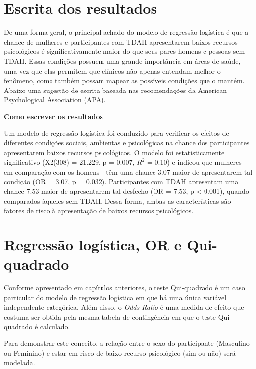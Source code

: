 \documentclass[
]{book}
\begin{document}
\hypertarget{escrita-dos-resultados-14}{%
\section{Escrita dos resultados}\label{escrita-dos-resultados-14}}

De uma forma geral, o principal achado do modelo de regressão logística é que a chance de mulheres e participantes com TDAH apresentarem baixos recursos psicológicos é significativamente maior do que seus pares homens e pessoas sem TDAH. Essas condições possuem uma grande importância em áreas de saúde, uma vez que elas permitem que clínicos não apenas entendam melhor o fenômeno, como também possam mapear as possíveis condições que o mantém. Abaixo uma sugestão de escrita baseada nas recomendações da American Psychological Association (APA).

\begin{writing}
\textbf{Como escrever os resultados}

Um modelo de regressão logística foi conduzido para verificar os efeitos
de diferentes condições sociais, ambientas e psicológicas na chance dos
participantes apresentarem baixos recursos psicológicos. O modelo foi
estatisticamente significativo (X2(308) = 21.229, p = 0.007, \(R^2\) =
0.10) e indicou que mulheres - em comparação com os homens - têm uma
chance 3.07 maior de apresentarem tal condição (OR = 3.07, p = 0.032).
Participantes com TDAH apresentam uma chance 7.53 maior de apresentarem
tal desfecho (OR = 7.53, p \textless{} 0.001), quando comparados àqueles
sem TDAH. Dessa forma, ambas as características são fatores de risco à
apresentação de baixos recursos psicológicos.
\end{writing}

\hypertarget{regressuxe3o-loguxedstica-or-e-qui-quadrado}{%
\section{Regressão logística, OR e Qui-quadrado}\label{regressuxe3o-loguxedstica-or-e-qui-quadrado}}

Conforme apresentado em capítulos anteriores, o teste Qui-quadrado é um caso particular do modelo de regressão logística em que há uma única variável independente categórica. Além disso, o \emph{Odds Ratio} é uma medida de efeito que costuma ser obtida pela mesma tabela de contingência em que o teste Qui-quadrado é calculado.

Para demonstrar este conceito, a relação entre o sexo do participante (Masculino ou Feminino) e estar em risco de baixo recurso psicológico (sim ou não) será modelada.
\end{document}
